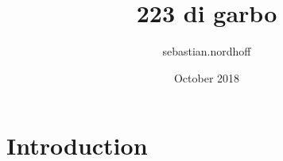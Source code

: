 \documentclass{article}
\title{223 di garbo}
\author{sebastian.nordhoff }
\date{October 2018}
\begin{document}
\maketitle

\section{Introduction}
\end{document}
